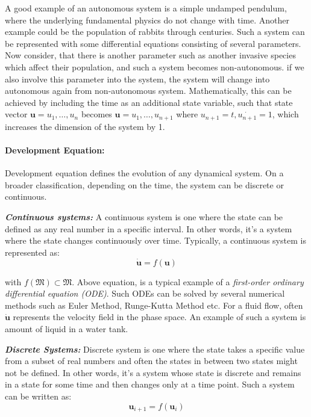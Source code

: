 A good example of an autonomous system is a simple undamped pendulum, where the underlying fundamental physics do not change with time. Another example could be the population of rabbits through centuries. Such a system can be represented with some differential equations consisting of several parameters. Now consider, that there is another parameter such as another invasive species which affect their population, and such a system becomes non-autonomous. if we also involve this parameter into the system, the system will change into autonomous again from non-autonomous system. Mathematically, this can be achieved by including the time as an additional state variable, such that state vector $\textbf{u} = { u_{1}, \dots, u_{n}}$ becomes $\textbf{u} = { u_{1}, \dots, u_{n+1}}$ where $ u_{n+1} = t, \dot{u_{n+1}} = 1$, which increases the dimension of the system by 1. 

\paragraph{Development Equation:} Development equation defines the evolution of any dynamical system. On a broader classification, depending on the time, the system can be discrete or continuous.

\textbf{\textit{Continuous systems:}} A continuous system is one where the state can be defined as any real number in a specific interval. In other words, it’s a system where the state changes continuously over time. Typically, a continuous system is represented as:
\begin{equation}
\dot{\mathbf{u}} = \textit{f}{\left( \textbf{u}\right) }
\end{equation}

with $\textit{f}(\mathfrak{M})\subset\mathfrak{M}$. Above equation, is a typical example of a \textit{first-order ordinary differential equation (ODE)}. Such ODEs can be solved by several numerical methods such as Euler Method, Runge-Kutta Method etc. For a fluid flow, often $\dot{\mathbf{u}}$ represents the velocity field in the phase space. An example of such a system is amount of liquid in a water tank.

\textbf{\textit{Discrete Systems:}} Discrete system is one where the state takes a specific value from a subset of real numbers and often the states in between two states might not be defined. In other words, it’s a system whose state is discrete and remains in a state for some time and then changes only at a time point. Such a system can be written as:
\begin{equation}
\mathbf{u}_{i+1} = \textit{f}{\left( \textbf{u}_{i}\right) }
\end{equation}

